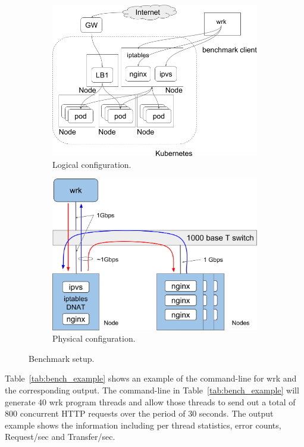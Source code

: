 \begin{figure}
\begin{subfigure}[t]{\columnwidth}
  \centering
  \includegraphics[width=0.8\columnwidth]{Figs/benchmark-schem}
  \vspace{1cm}
  \caption{Logical configuration.}
  \label{fig:benchmark-schem}
\end{subfigure}
  \vspace{1cm}

\begin{subfigure}[t]{\columnwidth}
  \centering
  \includegraphics[width=0.8\columnwidth]{Figs/bench_1g}
  \vspace{1cm}
  \caption{Physical configuration.}
  \label{fig:bench_1g}
\end{subfigure}
  \caption{Benchmark setup. }
  \label{fig:benchmark-setup}
\end{figure}

Table~\ref{tab:bench_example} shows an example of the command-line for wrk and the corresponding output.
The command-line in Table~\ref{tab:bench_example} will generate 40 wrk program threads and allow those threads to send out a total of 800 concurrent HTTP requests over the period of 30 seconds.
The output example shows the information including per thread statistics, error counts, Request/sec and Transfer/sec.

